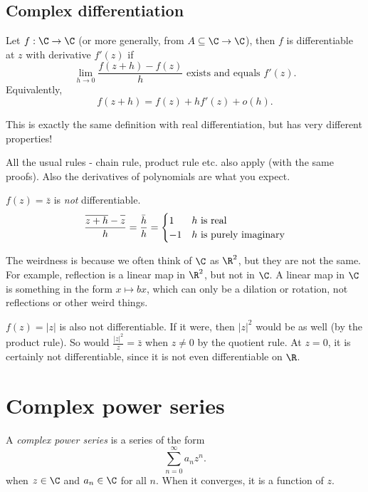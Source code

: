 \documentclass[a4paper]{article}
\begin{document}
\subsection{Complex differentiation}
\begin{defi}
  Let $f: \C \to \C$ (or more generally, from $A\subseteq \C \to \C$), then $f$ is differentiable at $z$ with derivative $f'(z)$ if
  \[
    \lim_{h \to 0}\frac{f(z + h) - f(z)}{h}\text{ exists and equals }f'(z).
  \]
  Equivalently,
  \[
    f(z + h) = f(z) + hf'(z) + o(h).
  \]
\end{defi}
This is exactly the same definition with real differentiation, but has very different properties!

All the usual rules - chain rule, product rule etc. also apply (with the same proofs). Also the derivatives of polynomials are what you expect.

\begin{eg}
  $f(z) = \bar z$ is \emph{not} differentiable.
  \[
    \frac{\overline{z + h} - \overline{z\vphantom{h}}}{h} = \frac{\bar h}{h} =
    \begin{cases}
      1 & h\text{ is real}\\
      -1 & h\text{ is purely imaginary}
    \end{cases}
  \]
\end{eg}
The weirdness is because we often think of $\C$ as $\R^2$, but they are not the same. For example, reflection is a linear map in $\R^2$, but not in $\C$. A linear map in $\C$ is something in the form $x \mapsto bx$, which can only be a dilation or rotation, not reflections or other weird things.

\begin{eg}
  $f(z) = |z|$ is also not differentiable. If it were, then $|z|^2$ would be as well (by the product rule). So would $\frac{|z|^2}{z} = \bar z$ when $z \not= 0$ by the quotient rule. At $z = 0$, it is certainly not differentiable, since it is not even differentiable on $\R$.
\end{eg}
\section{Complex power series}
\begin{defi}
  A \emph{complex power series} is a series of the form
  \[
    \sum_{n = 0}^{\infty}a_n z^n.
  \]
  when $z\in \C$ and $a_n\in \C$ for all $n$. When it converges, it is a function of $z$.
\end{defi}
\end{document}
